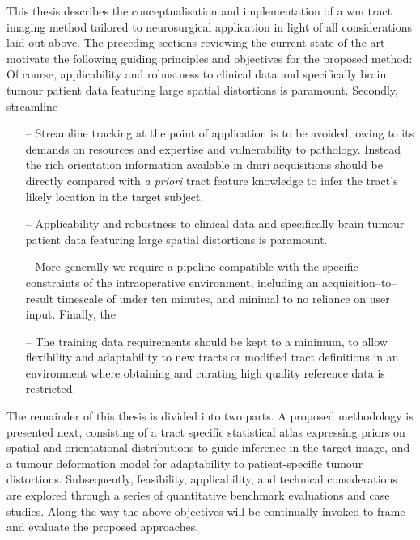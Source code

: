 \documentclass[12pt,phd,a4paper,twoside]{ucl_thesis}
\providecommand{\DIFaddtex}[1]{{\protect\color{blue} \sf #1}} %
\providecommand{\DIFdeltex}[1]{{\protect\color{red} \scriptsize #1}} %
\providecommand{\DIFaddbegin}{} %
\providecommand{\DIFaddend}{} %
\providecommand{\DIFdelbegin}{} %
\providecommand{\DIFdelend}{} %
\providecommand{\DIFadd}[1]{\texorpdfstring{\DIFaddtex{#1}}{#1}} %
\providecommand{\DIFdel}[1]{\texorpdfstring{\DIFdeltex{#1}}{}} %
\newcommand{\DIFscaledelfig}{0.5}
\newlength{\DIFdelgraphicswidth} %
\newlength{\DIFdelgraphicsheight} %
\newcommand{\DIFaddincludegraphics}[2][]{{\color{blue}\fbox{\DIFOincludegraphics[#1]{#2}}}} %
\newcommand{\DIFdelincludegraphics}[2][]{%
\sbox{\DIFdelgraphicsbox}{\DIFOincludegraphics[#1]{#2}}%
\settoboxwidth{\DIFdelgraphicswidth}{\DIFdelgraphicsbox} %
\settoboxtotalheight{\DIFdelgraphicsheight}{\DIFdelgraphicsbox} %
\scalebox{\DIFscaledelfig}{%
\parbox[b]{\DIFdelgraphicswidth}{\usebox{\DIFdelgraphicsbox}\\[-\baselineskip] \rule{\DIFdelgraphicswidth}{0em}}\llap{\resizebox{\DIFdelgraphicswidth}{\DIFdelgraphicsheight}{%
\setlength{\unitlength}{\DIFdelgraphicswidth}%
\begin{picture}(1,1)%
\thicklines\linethickness{2pt} %
{\color[rgb]{1,0,0}\put(0,0){\framebox(1,1){}}}%
{\color[rgb]{1,0,0}\put(0,0){\line( 1,1){1}}}%
{\color[rgb]{1,0,0}\put(0,1){\line(1,-1){1}}}%
\end{picture}%
}\hspace*{3pt}}} %
} %
\DeclareRobustCommand{\DIFaddbegin}{\DIFOaddbegin \let\includegraphics\DIFaddincludegraphics} %
\DeclareRobustCommand{\DIFaddend}{\DIFOaddend \let\includegraphics\DIFOincludegraphics} %
\DeclareRobustCommand{\DIFdelbegin}{\DIFOdelbegin \let\includegraphics\DIFdelincludegraphics} %
\DeclareRobustCommand{\DIFdelend}{\DIFOaddend \let\includegraphics\DIFOincludegraphics} %
\begin{document}
This thesis describes the conceptualisation and implementation of a \gls{wm} tract imaging method tailored to neurosurgical application in light of all considerations laid out above.
The preceding sections reviewing the current state of the art motivate the following guiding principles and objectives for the proposed method:
\DIFdelbegin \DIFdel{Of course, applicability and robustness to clinical data and specifically brain tumour patient data featuring large spatial distortions is paramount.
Secondly, streamline }\DIFdelend \DIFaddbegin \begin{itemize}[itemsep=0pt,parsep=0pt]
\item[\DIFadd{--}] \DIFadd{Streamline }\DIFaddend tracking at the point of application is to be avoided, owing to its demands on resources and expertise and vulnerability to pathology.
Instead the rich orientation information available in \gls{dmri} acquisitions should be directly compared with \textit{a priori} tract feature knowledge to infer the tract's likely location in the target subject.
\DIFaddbegin \item[\DIFadd{--}] \DIFadd{Applicability and robustness to clinical data and specifically brain tumour patient data featuring large spatial distortions is paramount.
}\item[\DIFadd{--}] \DIFaddend More generally we require a pipeline compatible with the specific constraints of the intraoperative environment, including an acquisition--to--result timescale of under ten minutes, and minimal to no reliance on user input.
\DIFdelbegin \DIFdel{Finally, the }\DIFdelend \DIFaddbegin \item[\DIFadd{--}] \DIFadd{The }\DIFaddend training data requirements should be kept to a minimum, to allow flexibility and adaptability to new tracts or modified tract definitions in an environment where obtaining and curating high quality reference data is restricted.
\DIFaddbegin \end{itemize}
\DIFaddend 

The remainder of this thesis is divided into two parts.
A proposed methodology is presented next, consisting of a tract specific statistical atlas expressing priors on spatial and orientational distributions to guide inference in the target image, and a tumour deformation model for adaptability to patient-specific tumour distortions.
Subsequently, feasibility, applicability, and technical considerations are explored through a series of quantitative benchmark evaluations and case studies.
Along the way the above objectives will be continually invoked to frame and evaluate the proposed approaches.
\clearpage{}
\end{document}
